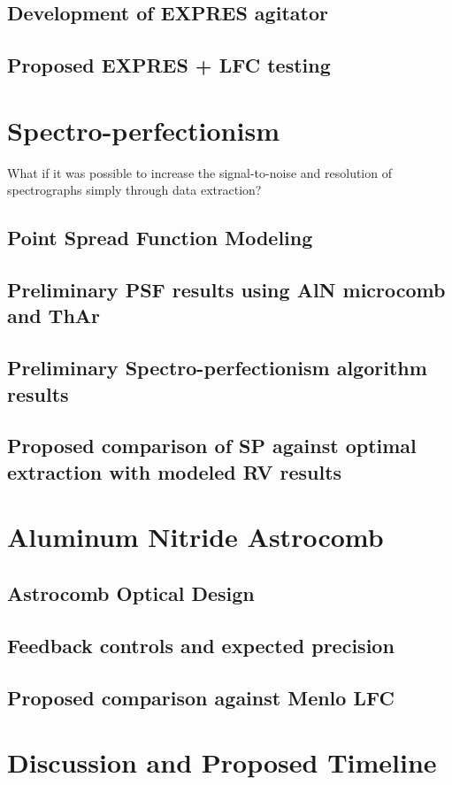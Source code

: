 \documentclass[12pt]{article}
\begin{document}
\subsection{Development of EXPRES agitator}

\subsection{Proposed EXPRES + LFC testing}

\section{Spectro-perfectionism}
\label{sec:spec_perf}

What if it was possible to increase the signal-to-noise and resolution of spectrographs simply through data extraction?

\subsection{Point Spread Function Modeling}

\subsection{Preliminary PSF results using AlN microcomb and ThAr}

\subsection{Preliminary Spectro-perfectionism algorithm results}

\subsection{Proposed comparison of SP against optimal extraction with modeled RV results}

\section{Aluminum Nitride Astrocomb}
\label{sec:astrocomb}

\subsection{Astrocomb Optical Design}

\subsection{Feedback controls and expected precision}

\subsection{Proposed comparison against Menlo LFC}

\section{Discussion and Proposed Timeline}

\pagebreak



\end{document}
